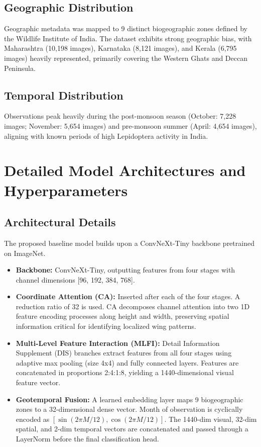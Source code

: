 \documentclass[runningheads]{llncs}
\begin{document}
\subsection{Geographic Distribution}
Geographic metadata was mapped to 9 distinct biogeographic zones defined by the Wildlife Institute of India. The dataset exhibits strong geographic bias, with Maharashtra (10,198 images), Karnataka (8,121 images), and Kerala (6,795 images) heavily represented, primarily covering the Western Ghats and Deccan Peninsula.

\subsection{Temporal Distribution}
Observations peak heavily during the post-monsoon season (October: 7,228 images; November: 5,654 images) and pre-monsoon summer (April: 4,654 images), aligning with known periods of high Lepidoptera activity in India.

\section{Detailed Model Architectures and Hyperparameters}
\subsection{Architectural Details}
The proposed baseline model builds upon a ConvNeXt-Tiny backbone pretrained on ImageNet.

\begin{itemize}
    \item \textbf{Backbone:} ConvNeXt-Tiny, outputting features from four stages with channel dimensions [96, 192, 384, 768].
    \item \textbf{Coordinate Attention (CA):} Inserted after each of the four stages. A reduction ratio of 32 is used. CA decomposes channel attention into two 1D feature encoding processes along height and width, preserving spatial information critical for identifying localized wing patterns.
    \item \textbf{Multi-Level Feature Interaction (MLFI):} Detail Information Supplement (DIS) branches extract features from all four stages using adaptive max pooling (size 4x4) and fully connected layers. Features are concatenated in proportions 2:4:1:8, yielding a 1440-dimensional visual feature vector.
    \item \textbf{Geotemporal Fusion:} A learned embedding layer maps 9 biogeographic zones to a 32-dimensional dense vector. Month of observation is cyclically encoded as $[\sin(2\pi M/12), \cos(2\pi M/12)]$. The 1440-dim visual, 32-dim spatial, and 2-dim temporal vectors are concatenated and passed through a LayerNorm before the final classification head.
\end{itemize}
\end{document}
